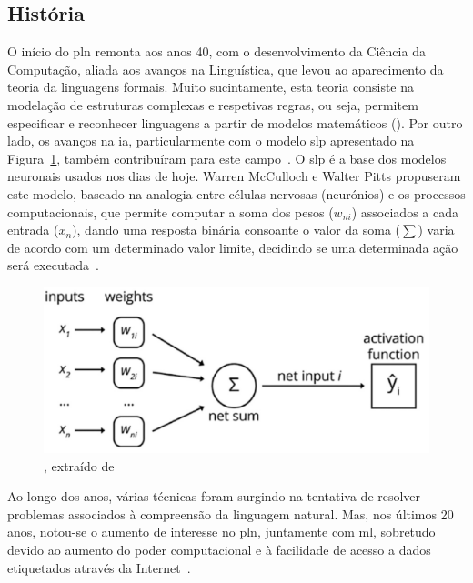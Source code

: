 \subsection{História}
O início do \gls{pln} remonta aos anos 40, com o desenvolvimento da Ciência da Computação, aliada aos avanços na Linguística, que levou ao aparecimento da teoria da linguagens formais. Muito sucintamente, esta teoria consiste na modelação de estruturas complexas e respetivas regras, ou seja, permitem especificar e reconhecer linguagens a partir de modelos matemáticos (). Por outro lado, os avanços na \gls{ia}, particularmente com o modelo \gls{slp} apresentado na Figura~\ref{fig:slp}, também contribuíram para este campo~\parencite{applied_natural_language_processing_with_python}. O \gls{slp} é a base dos modelos neuronais usados nos dias de hoje. Warren McCulloch e Walter Pitts propuseram este modelo, baseado na analogia entre células nervosas (neurónios) e os processos computacionais, que permite computar a soma dos pesos ($w_{ni}$) associados a cada entrada ($x_{n}$), dando uma resposta binária consoante o valor da soma ($\sum$) varia de acordo com um determinado valor limite, decidindo se uma determinada ação será executada~\parencite{introduction_theory_neural_computation}.

\begin{figure}[!t]
    \centering
    \includegraphics[width=.8\textwidth]{ch03/assets/slp_model.jpg}
    \caption{, extraído de~\textcite{applied_natural_language_processing_with_python}}
    \label{fig:slp}
\end{figure}

Ao longo dos anos, várias técnicas foram surgindo na tentativa de resolver problemas associados à compreensão da linguagem natural. Mas, nos últimos 20 anos, notou-se o aumento de interesse no \gls{pln}, juntamente com \gls{ml}, sobretudo devido ao aumento do poder computacional e à facilidade de acesso a dados etiquetados através da Internet~\parencite{applied_natural_language_processing_with_python}.

